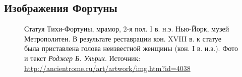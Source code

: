 \begin{appendices}
\chapter{Изображения Фортуны}\label{appendix:Pictura}

\begin{figure}[ht!]
\caption{Статуя Тихи-Фортуны, мрамор, 2-я пол. I в. н.э. Нью-Йорк, музей Метрополитен. В результате реставрации кон. XVIII в. к статуе была приставлена голова неизвестной женщины (кон. I в. н.э.). \footnotesize{Фото и текст \textit{Роджер Б. Ульрих}. Источник: \href{http://ancientrome.ru/art/artwork/img.htm?id=4038}{http://ancientrome.ru/art/artwork/img.htm?id=4038}}}
\label{pic:FortunaFlav}
\end{figure}



\end{appendices}
